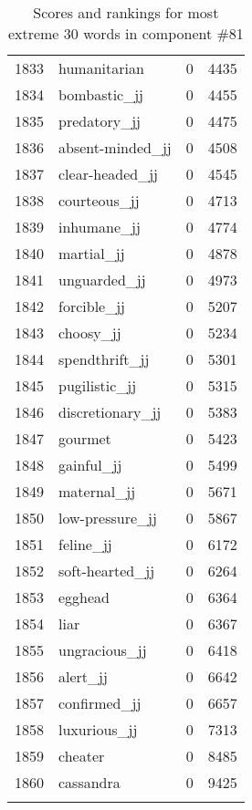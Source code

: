 \begin{longtable}[!htbp]{| rlr@{.}l |}
    1833 & humanitarian & 0 & 4435 \\
    1834 & bombastic\_jj & 0 & 4455 \\
    1835 & predatory\_jj & 0 & 4475 \\
    1836 & absent-minded\_jj & 0 & 4508 \\
    1837 & clear-headed\_jj & 0 & 4545 \\
    1838 & courteous\_jj & 0 & 4713 \\
    1839 & inhumane\_jj & 0 & 4774 \\
    1840 & martial\_jj & 0 & 4878 \\
    1841 & unguarded\_jj & 0 & 4973 \\
    1842 & forcible\_jj & 0 & 5207 \\
    1843 & choosy\_jj & 0 & 5234 \\
    1844 & spendthrift\_jj & 0 & 5301 \\
    1845 & pugilistic\_jj & 0 & 5315 \\
    1846 & discretionary\_jj & 0 & 5383 \\
    1847 & gourmet & 0 & 5423 \\
    1848 & gainful\_jj & 0 & 5499 \\
    1849 & maternal\_jj & 0 & 5671 \\
    1850 & low-pressure\_jj & 0 & 5867 \\
    1851 & feline\_jj & 0 & 6172 \\
    1852 & soft-hearted\_jj & 0 & 6264 \\
    1853 & egghead & 0 & 6364 \\
    1854 & liar & 0 & 6367 \\
    1855 & ungracious\_jj & 0 & 6418 \\
    1856 & alert\_jj & 0 & 6642 \\
    1857 & confirmed\_jj & 0 & 6657 \\
    1858 & luxurious\_jj & 0 & 7313 \\
    1859 & cheater & 0 & 8485 \\
    1860 & cassandra & 0 & 9425 \\
    \hline
    \caption{Scores and rankings for most extreme 30 words in component \#81} \\
\end{longtable}
